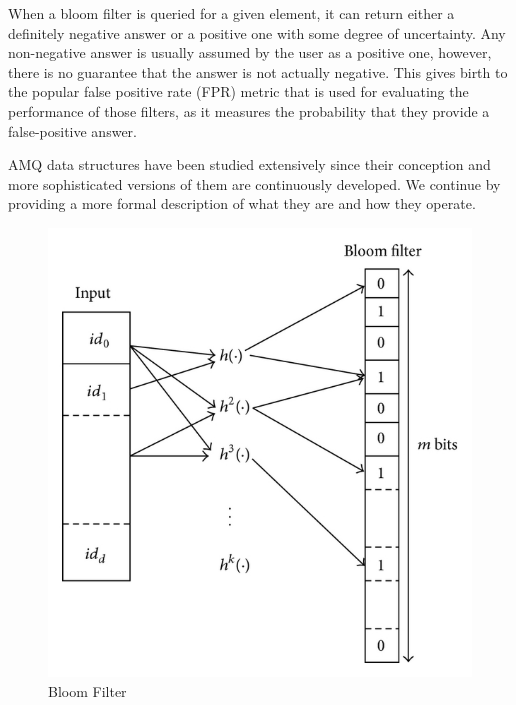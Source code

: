         When a bloom filter is queried for a given element, it can return either a definitely negative answer or a positive one with some degree of uncertainty.
        Any non-negative answer is usually assumed by the user as a positive one, however,
        there is no guarantee that the answer is not actually negative.
        This gives birth to the popular false positive rate (FPR) metric that is used for evaluating the performance of those filters, as it measures the probability that they provide a false-positive answer.
        
        AMQ data structures have been studied extensively since their conception and more sophisticated versions of them are continuously developed.
        We continue by providing a  more formal description of what they are and how they operate.
        
        \begin{figure}[h]
        \centering
        \includegraphics[scale=1.7]{figures/bloom_filter.jpg}
        \caption{Bloom Filter}
        \end{figure}
        
